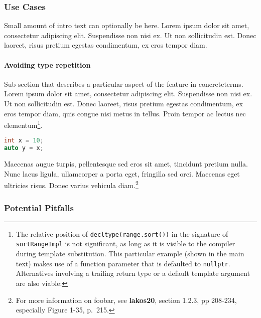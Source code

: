 \documentclass[twoside,10pt,letterpaper,usenames]{newstyle-PearsonGeneric-7-38}
\begin{document}
\subsubsection[Use Cases]{Use Cases}\label{use-cases}

Small amount of intro text can optionally be here. Lorem ipsum dolor sit
amet, consectetur adipiscing elit. Suspendisse non nisi ex. Ut non
sollicitudin est. Donec laoreet, risus pretium egestas condimentum, ex
eros tempor diam.

\paragraph[Avoiding type repetition]{Avoiding type repetition}\label{avoiding-type-repetition}

Sub-section that describes a particular aspect of the feature in
concreteterms. Lorem ipsum dolor sit amet, consectetur adipiscing elit.
Suspendisse non nisi ex. Ut non sollicitudin est. Donec laoreet, risus
pretium egestas condimentum, ex eros tempor diam, quis congue nisi metus
in tellus. Proin tempor ac lectus nec elementum{\cprotect\footnote{The
  relative position of \texttt{decltype(range.sort())} in the signature
  of \texttt{sortRangeImpl} is not significant, as long as it is visible
  to the compiler during template substitution. This particular example
  (shown in the main text) makes use of a function parameter that is
  defaulted to \texttt{nullptr}. Alternatives involving a trailing
  return type or a default template argument are also viable:}}.

\begin{lstlisting}[language=C++, caption={missing caption}, label={testlabel}, frame=tb]
int x = 10;
auto y = x;
\end{lstlisting}
    

Maecenas augue turpis, pellentesque sed eros sit amet, tincidunt pretium
nulla. Nunc lacus ligula, ullamcorper a porta eget, fringilla sed orci.
Maecenas eget ultricies risus. Donec varius vehicula
diam.{\cprotect\footnote{For more information on foobar, see
  \textbf{lakos20}, section 1.2.3, pp 208-234, especially Figure 1-35,
  p.~215.}}

\subsubsection[Potential Pitfalls]{Potential Pitfalls}\label{potential-pitfalls}
\end{document}
